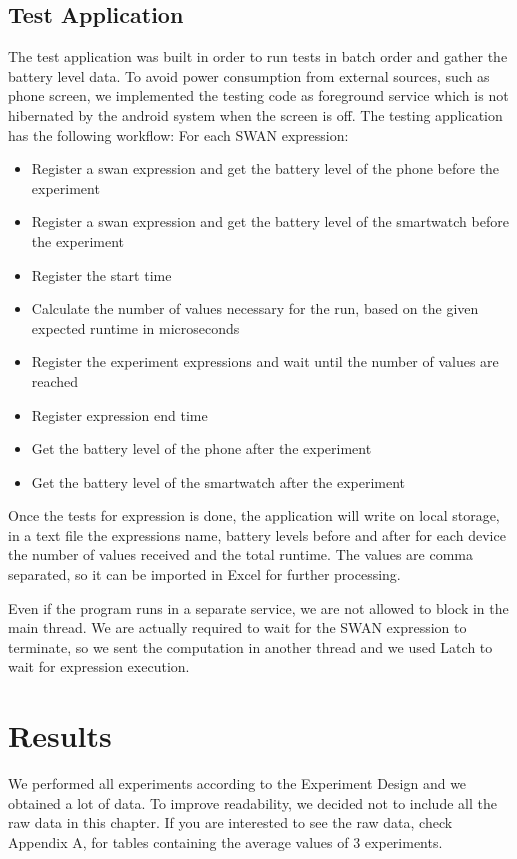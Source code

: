 \subsection{Test Application}
The test application was built in order to run tests in batch order and gather the battery level data. To avoid power consumption from external sources, such as phone screen, we implemented the testing code as foreground service\cite{foreground_service} which is not hibernated by the android system when the screen is off. 
The testing application has the following workflow:
For each SWAN expression:
\begin{itemize}
 \item Register a swan expression and get the battery level of the phone before the experiment
 \item Register a swan expression and get the battery level of the smartwatch before the experiment
 \item Register the start time
 \item Calculate the number of values necessary for the run, based on the given expected runtime in microseconds
 \item Register the experiment expressions and wait until the number of values are reached
 \item Register expression end time
 \item Get the battery level of the phone after the experiment
 \item Get the battery level of the smartwatch after the experiment
\end{itemize}


Once the tests for expression is done, the application will write on local storage, in a text file the expressions name,
battery levels before and after for each device the number of values received and the total runtime.
 The values are comma separated, so it can be imported in Excel for further processing.

Even if the program runs in a separate service, we are not allowed to block in the main thread. 
We are actually required to wait for the SWAN expression to terminate, so we sent the computation in another thread and we used Latch to wait for expression execution.

 \section{Results}

We performed all experiments according to the Experiment Design and we obtained a lot of data. To improve readability,
we decided not to include all the raw data in this chapter. If you are interested to see the raw data, check Appendix A, for tables containing the
average values of 3 experiments.

